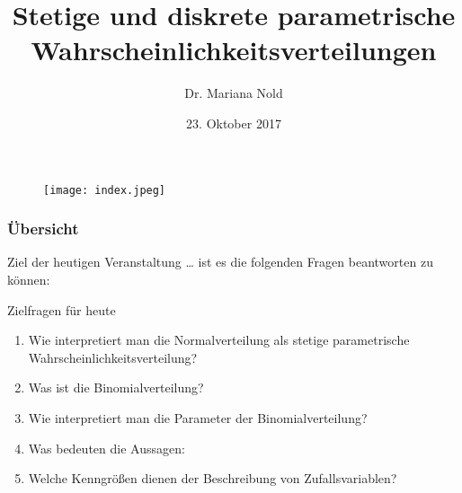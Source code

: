 \documentclass[usenames,dvipsnames,handout]{beamer}
\begin{document}
\author[Dr. Mariana Nold]{Dr. Mariana Nold}
 \date{}
\title [Verhalten von Zufallsvariablen]{Stetige und diskrete 
parametrische  Wahrscheinlichkeitsverteilungen}
\date{23. Oktober 2017}
\begin{frame}
\maketitle

  \begin{figure}[ht]
 	\centering
 	      \texttt{[image: index.jpeg]}
 	\end{figure}
\end{frame} 

\begin{frame}
  \frametitle{Übersicht}
  \tableofcontents
\end{frame}



\begin{frame}{Ziel der heutigen Veranstaltung \dots}
ist es die folgenden Fragen beantworten zu können:
\begin{block}{Zielfragen für heute}
\begin{enumerate}
\item{Wie interpretiert man die Normalverteilung als stetige
parametrische Wahrscheinlichkeitsverteilung?}
\item{Was ist die Binomialverteilung?}
\item{Wie interpretiert man die Parameter der Binomialverteilung?}
\item{Was bedeuten die Aussagen:}
\item{Welche Kenngrößen dienen der Beschreibung von Zufallsvariablen?}
\end{enumerate}
\end{block}
\end{frame}
\end{document}
